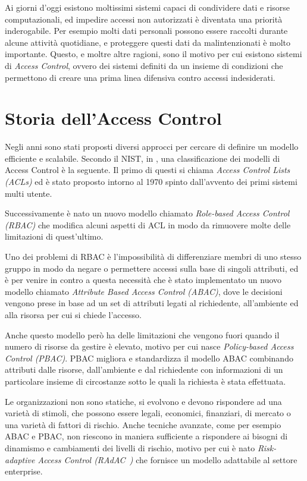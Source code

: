 \newcommand{\radac}{RAdAC\ }
\label{cap:accessControl}
Ai giorni d'oggi esistono moltissimi sistemi capaci di condividere dati e risorse computazionali, 
ed impedire accessi non autorizzati è diventata una priorità inderogabile.
Per esempio molti dati personali possono essere raccolti durante alcune attività quotidiane, e proteggere questi dati
da malintenzionati è molto importante.
Questo, e moltre altre ragioni, sono il motivo per cui esistono sistemi di \textit{Access Control}, ovvero dei sistemi definiti da un insieme di condizioni 
che permettono di creare una prima linea difensiva contro accessi indesiderati.
\section{Storia dell'Access Control}
\label{sec:history}
Negli anni sono stati proposti diversi approcci per cercare di definire un modello efficiente e scalabile. Secondo il NIST, in \cite{NISTACM}, una classificazione dei modelli di Access Control è la seguente. 
Il primo di questi si chiama \textit{Access Control Lists (ACLs)} ed è stato proposto intorno al 1970 spinto dall'avvento dei primi sistemi multi utente.\par
Successivamente è nato un nuovo modello chiamato \textit{Role-based Access Control (RBAC)} che modifica alcuni aspetti di ACL  in modo da rimuovere molte delle limitazioni di quest'ultimo. \par
Uno dei problemi di RBAC è l'impossibilità di differenziare membri di uno stesso gruppo in modo da negare o permettere accessi sulla base di singoli attributi, ed è per venire in contro a questa necessità che è stato implementato un nuovo modello chiamato \textit{Attribute Based Access Control (ABAC)}, dove le decisioni vengono prese in base ad un set di attributi legati al richiedente, all'ambiente ed alla risorsa per cui si chiede l'accesso. \par
Anche questo modello però ha delle limitazioni che vengono fuori quando il numero di risorse da gestire è elevato, motivo per cui nasce \textit{Policy-based Access Control (PBAC)}.
PBAC migliora e standardizza il modello ABAC combinando attributi dalle risorse, dall'ambiente e dal richiedente con informazioni di un particolare insieme di circostanze sotto le quali la richiesta è stata effettuata. \par
Le organizzazioni non sono statiche, si evolvono e devono rispondere ad una varietà di stimoli, che possono essere legali, economici, finanziari, di mercato o una varietà di fattori di rischio.
Anche tecniche avanzate, come per esempio ABAC e PBAC, non riescono in maniera sufficiente a rispondere ai bisogni di dinamismo e cambiamenti dei livelli di rischio, motivo per cui è nato \textit{Risk-adaptive Access Control (\radac)} che fornisce un modello adattabile al settore enterprise.

